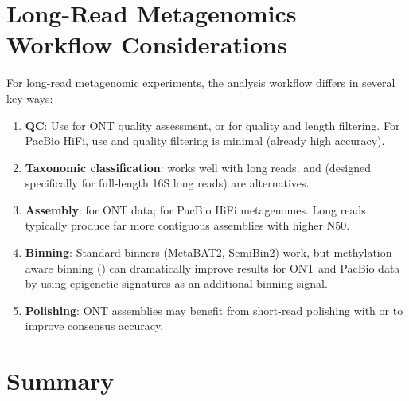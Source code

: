 \section{Long-Read Metagenomics Workflow Considerations}
\label{sec:longread_meta_workflow}

For long-read metagenomic experiments, the analysis workflow differs in several key ways:

\begin{enumerate}[nosep]
  \item \textbf{QC}: Use  for ONT quality assessment,  or  for quality and length filtering. For PacBio HiFi, use  and quality filtering is minimal (already high accuracy).
  \item \textbf{Taxonomic classification}:  works well with long reads.  and  (designed specifically for full-length 16S long reads) are alternatives.
  \item \textbf{Assembly}:  for ONT data;  for PacBio HiFi metagenomes. Long reads typically produce far more contiguous assemblies with higher N50.
  \item \textbf{Binning}: Standard binners (MetaBAT2, SemiBin2) work, but methylation-aware binning () can dramatically improve results for ONT and PacBio data by using epigenetic signatures as an additional binning signal.
  \item \textbf{Polishing}: ONT assemblies may benefit from short-read polishing with  or  to improve consensus accuracy.
\end{enumerate}

\section{Summary}
\label{sec:ch09_summary}

